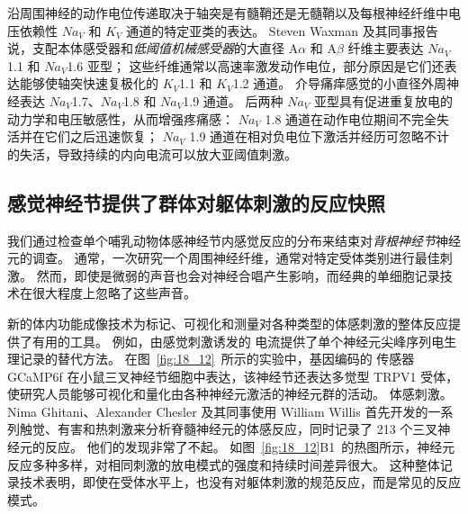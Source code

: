 沿周围神经的动作电位传递取决于轴突是有髓鞘还是无髓鞘以及每根神经纤维中电压依赖性 $Na_V$ 和 $K_V$ 通道的特定亚类的表达。
Steven Waxman 及其同事报告说，支配本体感受器和\textit{低阈值机械感受器}的大直径 A$\alpha$ 和 A$\beta$ 纤维主要表达 $Na_V$1.1 和 $Na_V$1.6 亚型；
这些纤维通常以高速率激发动作电位，部分原因是它们还表达能够使轴突快速复极化的 $K_V$1.1 和 $K_V$1.2 通道。
介导痛痒感觉的小直径外周神经表达 $Na_V$1.7、$Na_V$1.8 和 $Na_V$1.9 通道。
后两种 $Na_V$ 亚型具有促进重复放电的动力学和电压敏感性，从而增强疼痛感：
$Na_V$ 1.8 通道在动作电位期间不完全失活并在它们之后迅速恢复； 
$Na_V$ 1.9 通道在相对负电位下激活并经历可忽略不计的失活，导致持续的内向电流可以放大亚阈值刺激。



\subsection{感觉神经节提供了群体对躯体刺激的反应快照}

我们通过检查单个哺乳动物体感神经节内感觉反应的分布来结束对\textit{背根神经节}神经元的调查。
通常，一次研究一个周围神经纤维，通常对特定受体类别进行最佳刺激。
然而，即使是微弱的声音也会对神经合唱产生影响，而经典的单细胞记录技术在很大程度上忽略了这些声音。


新的体内功能成像技术为标记、可视化和测量对各种类型的体感刺激的整体反应提供了有用的工具。
例如，由感觉刺激诱发的  电流提供了单个神经元尖峰序列电生理记录的替代方法。
在图~\ref{fig:18_12}~所示的实验中，基因编码的  传感器 GCaMP6f 在小鼠三叉神经节细胞中表达，该神经节还表达多觉型 TRPV1 受体，使研究人员能够可视化和量化由各种神经元激活的神经元群的活动。 体感刺激。
Nima Ghitani、Alexander Chesler 及其同事使用 William Willis 首先开发的一系列触觉、有害和热刺激来分析脊髓神经元的体感反应，同时记录了 213 个三叉神经元的反应。
他们的发现非常了不起。
如图~\ref{fig:18_12}B1~的热图所示，神经元反应多种多样，对相同刺激的放电模式的强度和持续时间差异很大。 
这种整体记录技术表明，即使在受体水平上，也没有对躯体刺激的规范反应，而是常见的反应模式。

